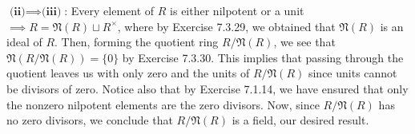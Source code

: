 \vspace{3 mm}

$\textbf{(ii)} \implies \textbf{(iii)}$:
\newline
Every element of $R$ is either nilpotent or a unit $\implies R = \mathfrak{N}(R) \sqcup R^\times$, where by Exercise 7.3.29, we obtained that $\mathfrak{N}(R)$ is an ideal of $R$. Then, forming the quotient ring $R/\mathfrak{N}(R)$, we see that $\mathfrak{N}(R/\mathfrak{N}(R)) = \{0\}$ by Exercise 7.3.30. This implies that passing through the quotient leaves us with only zero and the units of $R/\mathfrak{N}(R)$ since units cannot be divisors of zero. Notice also that by Exercise 7.1.14, we have ensured that only the nonzero nilpotent elements are the zero divisors. Now, since $R/\mathfrak{N}(R)$ has no zero divisors, we conclude that $R/\mathfrak{N}(R)$ is a field, our desired result.